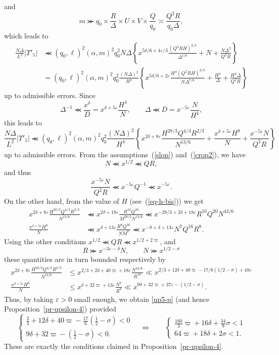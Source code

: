 \documentclass[12pt,a4paper,reqno]{amsart}
\numberwithin{equation}{section}
\theoremstyle{plain}
\theoremstyle{definition}
\newcommand\eps{\varepsilon}
\renewcommand{\sim}{\asymp}
\renewcommand{\lessapprox}{\llcurly}
\begin{document}
and
$$
m\ggcurly q_0\times \frac{R}{\Delta} \times U\times V
\times\frac{Q}{q_0}\sim \frac{Q^2R}{q_0\Delta},
$$
which leads to
\begin{align*}
\frac{N\Delta}{L^2} | \Upsilon'_5| &\lessapprox (q_0,\ell)^2(\alpha,m)^2q_0^2N\Delta \left\{
    x^{5\delta/6+4\eps/3} \frac{(Q^2RH)^{2/3}}{\Delta^{1/6}} + N
    + \frac{N\Delta^2}{Q^2R}\right\}\\
&  = (q_0,\ell)^2(\alpha,m)^2q_0^2\frac{(N\Delta)^2}{H^4} \left\{
    x^{5\delta/6+2\eps} \frac{H^4(Q^2RH)^{2/3}}{N\Delta^{7/6}} + \frac{H^4}{\Delta} +
    \frac{H^4\Delta}{Q^2R}\right\}
\end{align*}
up to admissible errors. Since
$$
\Delta^{-1}\lessapprox \frac{x^{\delta}}{D} =
x^{\delta+5\eps}\frac{H^4}{N}, \quad\quad \Delta\lessapprox D
= x^{-5\eps}\frac{N}{H^4},
$$
this leads to
$$
\frac{N\Delta}{L^2} | \Upsilon'_5| \lessapprox
(q_0,\ell)^2(\alpha,m)^2q_0^2\frac{(N\Delta)^2}{H^4} \left\{
  x^{2\delta+8\eps} \frac{H^{28/3}Q^{4/3}R^{2/3}}{N^{13/6}} +
  \frac{x^{\delta+5\eps}H^8}{N} + \frac{x^{-5\eps}N}{Q^2R}\right\}
$$
up to admissible errors.  From the assumptions~(\ref{slop})
and~(\ref{crop2}), we have
$$
N\lessapprox x^{1/2}\lessapprox QR,
$$
and thus 
$$
\frac{x^{-5\eps}N}{Q^2R}\lessapprox x^{-5\eps}Q^{-1}\lessapprox
x^{-5\eps}.
$$
On the other hand, from the value of $H$ (see~(\ref{eq-h-bis})) we get
\begin{align*}
 x^{2\delta+8\eps} \frac{H^{28/3}Q^{4/3}R^{2/3}}{N^{13/6}}&
\lessapprox  x^{2\delta+18\eps}\frac{R^{10}Q^{20}}{M^{28/3}N^{13/6}}
\lessapprox  x^{-28/3+2\delta+18\eps}R^{10}Q^{20}N^{43/6}
\\
 \frac{x^{\delta+5\eps}H^8}{N}&\lessapprox
 x^{\delta+13\eps}\frac{R^8Q^{16}}{NM^8}
\lessapprox x^{-8+\delta+13\eps}N^7Q^{16}R^8.
\end{align*}
Using the other conditions $x^{1/2} \lessapprox QR \lessapprox
x^{1/2+2\varpi}$, and
$$
R\ggcurly x^{-3\eps-\delta}N,\quad\quad N\ggcurly x^{1/2-\sigma}
$$
these quantities are in turn bounded respectively by
\begin{align*}
  x^{2\delta+8\eps} \frac{H^{28/3}Q^{4/3}R^{2/3}}{N^{13/6}}& \leq
  x^{2/3+2\delta+40\varpi+18\eps}\frac{N^{43/6}}{R^{10}} \ll
  x^{2/3+12\delta+40\varpi-17/6(1/2-\sigma)+48\eps}
  \\
  \frac{x^{\delta+5\eps}H^8}{N}&\leq
  x^{\delta+32\varpi+13\eps}\frac{N^7}{R^8} \ll
  x^{9\delta+32\varpi+37\eps-(1/2-\sigma)}.
\end{align*}
Thus, by taking $\eps>0$ small enough, we obtain \eqref{up5-p} (and hence
Proposition~\ref{pr-upsilon-4}) provided
$$
\begin{cases}
\tfrac{2}{3}+12\delta+40\varpi-\tfrac{17}{6}(\tfrac{1}{2}-\sigma)<0\\
9\delta+32\varpi-(\tfrac{1}{2}-\sigma)<0.
\end{cases}\quad
\Leftrightarrow \quad\quad
\begin{cases}
\tfrac{160}{3}\varpi+16\delta+\tfrac{34}{9}\sigma<1\\
64\varpi+18\delta+2\sigma<1.
\end{cases}
$$
These are exactly the conditions claimed in
Proposition~\ref{pr-upsilon-4}.
\end{document}
